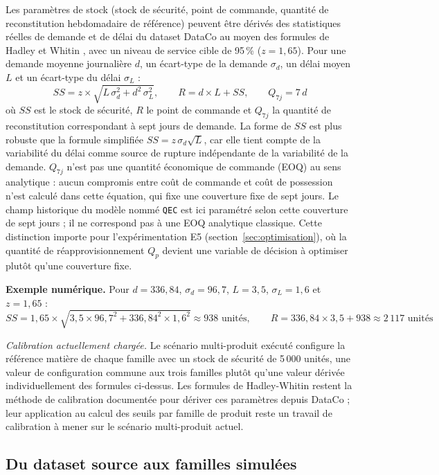 \documentclass[11pt,a4paper]{article}
\newcommand{\code}[1]{\texttt{#1}}
\begin{document}
Les paramètres de stock (stock de sécurité, point de commande, quantité de reconstitution hebdomadaire de référence) peuvent être dérivés des statistiques réelles de demande et de délai du dataset DataCo au moyen des formules de Hadley et Whitin \cite{hadleywhitin1963}, avec un niveau de service cible de 95\,\% (\(z=1{,}65\)). Pour une demande moyenne journalière \(d\), un écart-type de la demande \(\sigma_d\), un délai moyen \(L\) et un écart-type du délai \(\sigma_L\) :
\[
SS = z\times\sqrt{L\,\sigma_d^2 + d^2\,\sigma_L^2}, \qquad
R = d\times L + SS, \qquad
Q_{7j} = 7\,d
\]
où \(SS\) est le stock de sécurité, \(R\) le point de commande et \(Q_{7j}\) la quantité de reconstitution correspondant à sept jours de demande. La forme de \(SS\) est plus robuste que la formule simplifiée \(SS=z\,\sigma_d\sqrt{L}\), car elle tient compte de la variabilité du délai comme source de rupture indépendante de la variabilité de la demande. \(Q_{7j}\) n'est pas une quantité économique de commande (EOQ) au sens analytique : aucun compromis entre coût de commande et coût de possession n'est calculé dans cette équation, qui fixe une couverture fixe de sept jours. Le champ historique du modèle nommé \code{QEC} est ici paramétré selon cette couverture de sept jours ; il ne correspond pas à une EOQ analytique classique. Cette distinction importe pour l'expérimentation E5 (section~\ref{sec:optimisation}), où la quantité de réapprovisionnement \(Q_p\) devient une variable de décision à optimiser plutôt qu'une couverture fixe.

\textbf{Exemple numérique.} Pour \(d=336{,}84\), \(\sigma_d=96{,}7\), \(L=3{,}5\), \(\sigma_L=1{,}6\) et \(z=1{,}65\) :
\[
SS = 1{,}65\times\sqrt{3{,}5\times96{,}7^2 + 336{,}84^2\times1{,}6^2} \approx 938 \text{ unités}, \qquad
R = 336{,}84\times3{,}5 + 938 \approx 2\,117 \text{ unités}
\]

\textit{Calibration actuellement chargée.} Le scénario multi-produit exécuté configure la référence matière de chaque famille avec un stock de sécurité de 5\,000 unités, une valeur de configuration commune aux trois familles plutôt qu'une valeur dérivée individuellement des formules ci-dessus. Les formules de Hadley-Whitin restent la méthode de calibration documentée pour dériver ces paramètres depuis DataCo ; leur application au calcul des seuils par famille de produit reste un travail de calibration à mener sur le scénario multi-produit actuel.

\subsection{Du dataset source aux familles simulées}
\label{sec:optimisation-familles}
\end{document}
